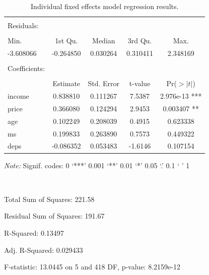 \documentclass[12pt]{article}
\begin{document}
\begin{table}[!htbp] \centering 
\begin{threeparttable}
  \caption{Individual fixed effects model regression results.} 
  \label{} 
\begin{tabular}{@{\extracolsep{5pt}}lcccc} 
 \toprule
\midrule
\\
Residuals: \\
\hline \\[-1.8ex]
     Min.  & 1st Qu. &   Median &  3rd Qu.   &   Max. \\
-3.608066 & -0.264850 &  0.030264  & 0.310411 &  2.348169 \\
\\
Coefficients: \\
\hline \\[-1.8ex] 
   &     Estimate & Std. Error &  t-value  & Pr($>|t|$)    \\
income &  0.838810  &  0.111267 & 7.5387 & 2.976e-13 *** \\
price  &  0.366080  &  0.124294 & 2.9453 &  0.003407 ** \\
age   &  0.102249  &  0.208039  & 0.4915 &  0.623338    \\
ms    &  0.199833 &  0.263890 & 0.7573  & 0.449322    \\
deps   & -0.086352  & 0.053483 & -1.6146 &  0.107154  \\
\bottomrule
 \end{tabular}
 \begin{tablenotes}  
\small
\item \textit{Note:} Signif. codes:  0 ‘***’ 0.001 ‘**’ 0.01 ‘*’ 0.05 ‘.’ 0.1 ‘ ’ 1
\item \ 
\item Total Sum of Squares:    221.58
\item Residual Sum of Squares: 191.67
\item R-Squared:      0.13497
\item Adj. R-Squared: 0.029433
\item F-statistic: 13.0445 on 5 and 418 DF, p-value: 8.2159e-12
\end{tablenotes}
  \end{threeparttable}
\end{table} 

\newpage
\end{document}
